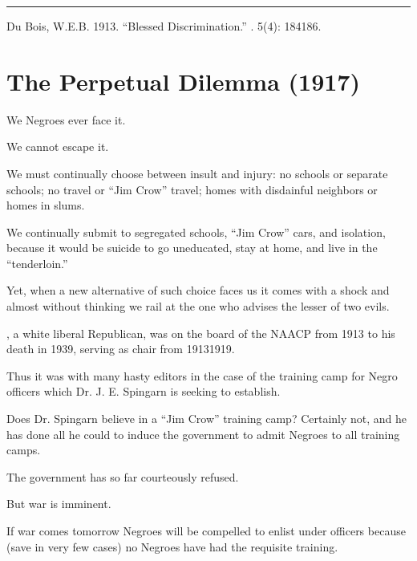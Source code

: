 \documentclass[letterpaper,10pt,english]{jupyterBook}
\begin{document}
\bigskip\hrule\bigskip


\sphinxAtStartPar
{} Du Bois, W.E.B. 1913. “Blessed Discrimination.”  . 5(4): 184\sphinxhyphen{}186.


\section{The Perpetual Dilemma (1917)}
\label{\detokenize{Volumes/13/06/perpetual_dilemma:the-perpetual-dilemma-1917}}\label{\detokenize{Volumes/13/06/perpetual_dilemma::doc}}
\sphinxAtStartPar
We Negroes ever face it.

\sphinxAtStartPar
We cannot escape it.

\sphinxAtStartPar
We must continually choose between insult and injury: no schools or separate schools; no travel or “Jim Crow” travel; homes with disdainful neighbors or homes in slums.

\sphinxAtStartPar
We continually submit to segregated schools, “Jim Crow” cars, and isolation, because it would be suicide to go uneducated, stay at home, and live in the “tenderloin.”

\sphinxAtStartPar
Yet, when a new alternative of such choice faces us it comes with a shock and almost without thinking we rail at the one who advises the lesser of two evils.

\begin{sphinxShadowBox}
\sphinxstylesidebartitle{}

\sphinxAtStartPar
{}, a white liberal Republican, was on the board of the NAACP from 1913 to his death in 1939, serving as chair from 1913\sphinxhyphen{}1919.
\end{sphinxShadowBox}

\sphinxAtStartPar
Thus it was with many hasty edi­tors in the case of the training camp for Negro officers which Dr. J. E. Spingarn is seeking to establish.

\sphinxAtStartPar
Does Dr. Spingarn believe in a “Jim Crow” training camp? Certainly not, and he has done all he could to induce the government to admit Negroes to all training camps.

\sphinxAtStartPar
The government has so far courteously refused.

\sphinxAtStartPar
But war is imminent.

\sphinxAtStartPar
If war comes to\sphinxhyphen{}morrow Negroes will be compelled to enlist under  officers because (save in very few cases) no Negroes have had the requisite training.
\end{document}
